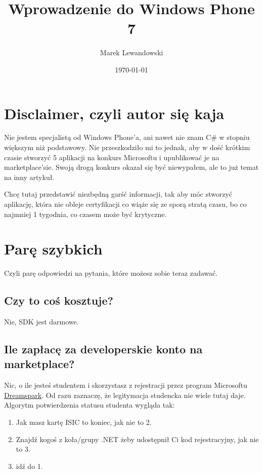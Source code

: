 \documentclass[12pt, a4paper]{article}
\begin{document}
\title{Wprowadzenie do Windows Phone 7}
\author{Marek Lewandowski}
\date{\today}

\maketitle


\section{Disclaimer, czyli autor się kaja}
 Nie jestem specjalistą od Windows Phone'a, ani nawet nie znam C\# w stopniu
 większym niż podstawowy. Nie przeszkodziło mi to jednak, aby w dość krótkim czasie stworzyć 5 aplikacji na
konkurs Microsoftu i upublikować je na marketplace'sie. Swoją drogą konkurs
okazał się być niewypałem, ale to już temat na inny artykuł.

Chcę tutaj przedstawić niezbędną garść informacji, tak aby móc stworzyć
aplikację, która nie obleje certyfikacji co wiąże się ze sporą
stratą czasu, bo co najmniej 1 tygodnia, co czasem może być krytyczne.

\section{Parę szybkich}
Czyli parę odpowiedzi na pytania, które możesz sobie teraz zadawać.
\subsection{Czy to coś kosztuje?}
Nie, SDK jest darmowe.
\subsection{Ile zapłacę za developerskie konto na marketplace?}
Nic, o ile jesteś studentem i skorzystasz z rejestracji przez program Microsoftu
\href{https://www.dreamspark.com/}{Dreamspark}. Od razu zaznaczę, że legitymacja
studencka nie wiele tutaj daje. Algorytm potwierdzenia statusu studenta wygląda
tak:
\begin{enumerate}
  \item Jak masz kartę ISIC to koniec, jak nie to 2.
  \item Znajdź kogoś z koła/grupy .NET żeby udostępnił Ci kod rejestracyjny, jak
  nie to 3.
  \item idź do 1.
\end{enumerate}
\end{document}

